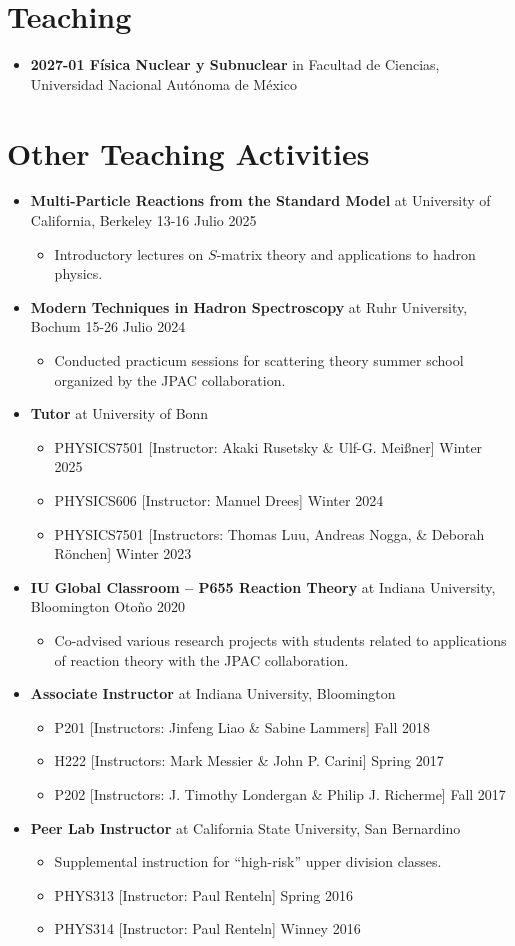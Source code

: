 \documentclass[letterpaper,11pt]{article}
\newcommand{\outerlist}[1]{
    \begin{itemize}[leftmargin=*] #1 \end{itemize}}
\newcommand{\innerlist}[1]{
    \begin{itemize}[topsep=0pt] #1 \end{itemize}}
\newcommand{\entry}[1]{\item\small{#1}}
\begin{document}

\section{Teaching}
\outerlist{
    \entry{\textbf{2027-01 Física Nuclear y Subnuclear} in Facultad de Ciencias, Universidad Nacional Autónoma de México}
}

\section{Other Teaching Activities}
\outerlist{
    \entry{\textbf{Multi-Particle Reactions from the Standard Model} at University of California, Berkeley \hfill 13-16 Julio 2025}
        \innerlist{
            \entry{Introductory lectures on $S$-matrix theory and applications to hadron physics.}
        }
    \entry{\textbf{Modern Techniques in Hadron Spectroscopy} at Ruhr University, Bochum \hfill 15-26 Julio 2024}
        \innerlist{
            \entry{Conducted practicum sessions for scattering theory summer school organized by the JPAC collaboration.}
        }
\entry{\textbf{Tutor} at University of Bonn}
    \innerlist{
        \entry{PHYSICS7501 [Instructor: Akaki Rusetsky \& Ulf-G. Mei\ss ner] \hfill Winter 2025}
        \entry{PHYSICS606 [Instructor: Manuel Drees] \hfill Winter 2024}
        \entry{PHYSICS7501 [Instructors: Thomas Luu, Andreas Nogga, \& Deborah R\"{o}nchen] \hfill Winter 2023}
    }
    \entry{\textbf{IU Global Classroom -- P655 Reaction Theory} at Indiana University, Bloomington \hfill Otoño 2020}
        \innerlist{
            \entry{Co-advised various research projects with students related to applications of reaction theory with the JPAC collaboration.}
        }
    \entry{\textbf{Associate Instructor} at Indiana University, Bloomington}
        \innerlist{
            \entry{P201 [Instructors: Jinfeng Liao \& Sabine Lammers] \hfill Fall 2018}
            \entry{H222 [Instructors: Mark Messier \& John P. Carini] \hfill Spring 2017}
            \entry{P202 [Instructors: J. Timothy Londergan \& Philip J. Richerme] \hfill Fall 2017}
            
        }
\entry{\textbf{Peer Lab Instructor} at California State University, San Bernardino}
    \innerlist{
        \entry{Supplemental instruction for ``high-risk'' upper division classes.}
        \entry{PHYS313 [Instructor: Paul Renteln] \hfill Spring 2016}
        \entry{PHYS314 [Instructor: Paul Renteln] \hfill Winney 2016}
    }
} 
\end{document}
